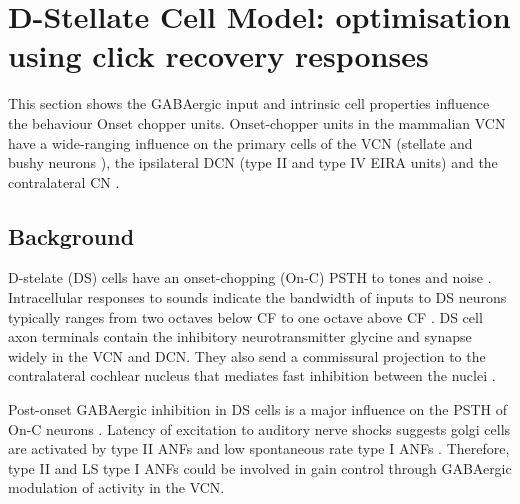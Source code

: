 
\graphicspath{{/media/data/Work/cnstellate/DS_ClickRecovery/}{/media/data/Work/Responses/}{../figures/}{./gfx/}}
\section[DS Cell Model]{D-Stellate Cell Model: optimisation using click recovery responses}
\label{sec:d-stellate-cell-model}


This section shows the GABAergic input and intrinsic cell properties
influence the behaviour Onset chopper units.  Onset-chopper units in
the mammalian VCN have a wide-ranging influence on the primary cells
of the VCN (stellate and bushy neurons \citep{RhodeSmithEtAl:1983}),
the ipsilateral DCN (type II and type IV EIRA units) and the
contra\-lateral CN \citep{NeedhamPaolini:2007}.

\medskip{}





\subsection{Background}

  
D-stelate (DS) cells have an onset-chopping (On-C) PSTH to tones and
noise \citep{SmithRhode:1989,NeedhamPaolini:2006}. Intracellular
responses to sounds indicate the bandwidth of inputs to DS neurons
typically ranges from two octaves below CF to one octave above CF
\citep{PalmerJiangEtAl:1996,PaoliniClark:1999}. DS cell axon terminals
contain the inhibitory neurotransmitter glycine and synapse widely in
the VCN and DCN\@.  They also send a commissural projection to the
contralateral cochlear nucleus that mediates fast inhibition between
the nuclei \citep{NeedhamPaolini:2003,NeedhamPaolini:2006}.
\citep{Oertel:1997}


\medskip{}

Post-onset GABAergic inhibition in DS cells is a major influence on
the PSTH of On-C neurons
\citep{FerragamoGoldingEtAl:1998a,EvansZhao:1998}. Latency of
excitation to auditory nerve shocks suggests golgi cells are activated
by type II ANFs and low spontaneous rate type I ANFs
\citep{BensonBerglundEtAl:1996,FerragamoGoldingEtAl:1998}. Therefore,
type II and LS type I ANFs could be involved in gain control through
GABAergic modulation of activity in the VCN.


